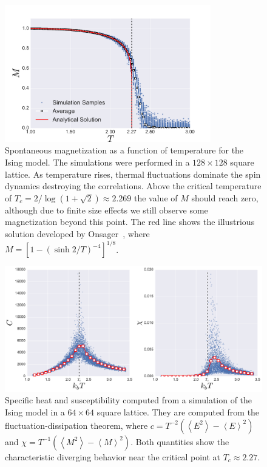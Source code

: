 \begin{figure}
\begin{center}
    \includegraphics[width=0.8\textwidth]{chapters/ch2-crit/figs/ising_phase}
\end{center}
\caption{Spontaneous magnetization as a function of temperature for the Ising
    model. The simulations were performed in a $128\times128$ square lattice.
    As temperature rises, thermal fluctuations dominate the spin dynamics
    destroying the correlations. Above the critical temperature of
    $T_c=2/\log(1+\sqrt{2})\approx 2.269$ the value of $M$ should reach zero,
    although due to finite size effects we still observe some magnetization
    beyond this point. The red line shows the illustrious solution
    developed by Onsager~\cite{Onsager1944}, where
    $M={[1-{(\sinh{2/T})}^{-4}]}^{1/8}$.}
\label{fig:ising_phase}
\end{figure}

\begin{figure}
\begin{center}
    \includegraphics[width=\textwidth]{chapters/ch2-crit/figs/ising_cx}
\end{center}
\caption{Specific heat and susceptibility computed from a simulation of the
    Ising model in a $64\times 64$ square lattice. They are computed from the
    fluctuation-dissipation theorem, where $c=T^{-2}\left(\left\langle
    E^{2}\right\rangle -\left\langle E\right\rangle ^{2}\right)$ and
    $\chi=T^{-1}\left(\left\langle M^{2}\right\rangle -\left\langle
    M\right\rangle ^{2}\right)$. Both quantities show the characteristic
    diverging behavior near the critical point at $T_c\approx 2.27$.}
\label{fig:ising_cx}
\end{figure}



